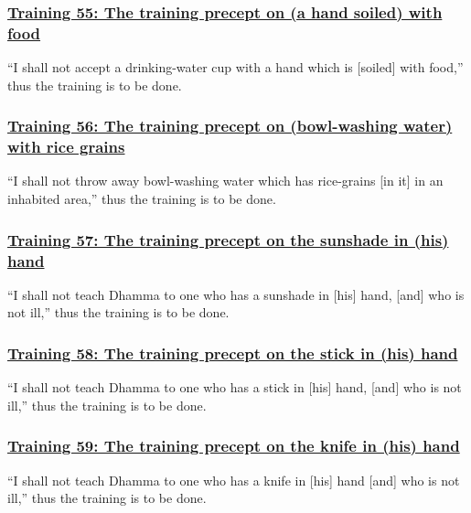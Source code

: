 \subsubsection*{\hyperref[sekh55]{Training 55: The training precept on (a hand soiled) with food}}
\label{training55}
``I shall not accept a drinking-water cup with a hand which is [soiled] with food,'' thus the training is to be done.



\subsubsection*{\hyperref[sekh56]{Training 56: The training precept on (bowl-washing water) with rice grains}}
\label{training56}
``I shall not throw away bowl-washing water which has rice-grains [in it] in an inhabited area,'' thus the training is to be done.



\subsubsection*{\hyperref[sekh57]{Training 57: The training precept on the sunshade in (his) hand}}
\label{training57}
``I shall not teach Dhamma to one who has a sunshade in [his] hand, [and] who is not ill,'' thus the training is to be done.



\subsubsection*{\hyperref[sekh58]{Training 58: The training precept on the stick in (his) hand}}
\label{training58}
``I shall not teach Dhamma to one who has a stick in [his] hand, [and] who is not ill,'' thus the training is to be done.



\subsubsection*{\hyperref[sekh59]{Training 59: The training precept on the knife in (his) hand}}
\label{training59}
``I shall not teach Dhamma to one who has a knife in [his] hand [and] who is not ill,'' thus the training is to be done.



